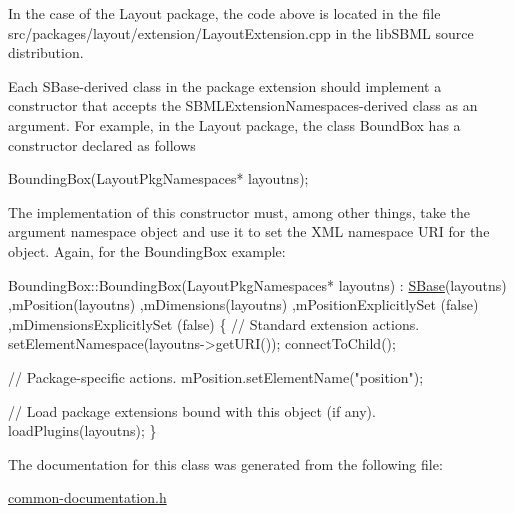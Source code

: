 In the case of the Layout package, the code above is located in the file {\ttfamily src/packages/layout/extension/\+Layout\+Extension.\+cpp} in the lib\+S\+B\+ML source distribution.

Each S\+Base-\/derived class in the package extension should implement a constructor that accepts the S\+B\+M\+L\+Extension\+Namespaces-\/derived class as an argument. For example, in the Layout package, the class Bound\+Box has a constructor declared as follows


\begin{DoxyCode}
BoundingBox(LayoutPkgNamespaces* layoutns);
\end{DoxyCode}


The implementation of this constructor must, among other things, take the argument namespace object and use it to set the X\+ML namespace U\+RI for the object. Again, for the Bounding\+Box example\+:


\begin{DoxyCode}
BoundingBox::BoundingBox(LayoutPkgNamespaces* layoutns)
 : \hyperlink{class_s_base}{SBase}(layoutns)
  ,mPosition(layoutns)
  ,mDimensions(layoutns)
  ,mPositionExplicitlySet (false)
  ,mDimensionsExplicitlySet (false)
\{
  \textcolor{comment}{// Standard extension actions.}
  setElementNamespace(layoutns->getURI());
  connectToChild();

  \textcolor{comment}{// Package-specific actions.}
  mPosition.setElementName(\textcolor{stringliteral}{"position"});

  \textcolor{comment}{// Load package extensions bound with this object (if any).}
  loadPlugins(layoutns);
\}
\end{DoxyCode}
 

The documentation for this class was generated from the following file\+:\begin{DoxyCompactItemize}
\item 
\hyperlink{common-documentation_8h}{common-\/documentation.\+h}\end{DoxyCompactItemize}
